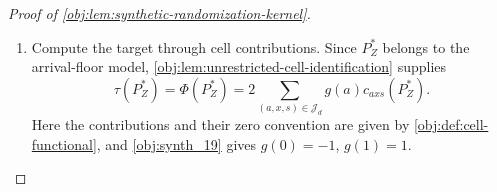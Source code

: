 \begin{proof}[Proof of \cref{obj:lem:synthetic-randomization-kernel}]
\begin{enumerate}
For a deterministic input sample
\[
\mathbf z=((x_i,b_i,y_i))_{i=1}^n
\in\bigl(\{1,\ldots,d\}\times\{0,1\}^2\bigr)^n
\]
and \(\mathbf u=(u_i)_{i=1}^n\in\{0,1\}^n\), define
\[
\mathsf o_n(\mathbf z,\mathbf u)
:=
\bigl(o(x_i,b_i,y_i;u_i)\bigr)_{i=1}^n,
\qquad
\kappa_{\mathrm{syn},n}(\mathbf z,\cdot)
:=
\bigotimes_{i=1}^n
\kappa_{\mathrm{syn}}\bigl((x_i,b_i,y_i),\cdot\bigr).
\]
Independent fair draws give
\[
\kappa_{\mathrm{syn},n}(\mathbf z,\cdot)
=
\bigl(\mathsf o_n(\mathbf z,\cdot)\bigr)_{\#}
\nu_{\mathrm{coin}}^{\otimes n},
\]
where the subscript \(\#\) denotes pushforward. Integrating over the input sample, regrouping the product coordinates into record--coin pairs, and then applying the record map coordinatewise gives
\[
\begin{aligned}
\int\kappa_{\mathrm{syn},n}(\mathbf z,\cdot)\,
P_Z^{\otimes n}(d\mathbf z)
&=
(\mathsf o_n)_{\#}
\bigl(P_Z^{\otimes n}\otimes\nu_{\mathrm{coin}}^{\otimes n}\bigr)\\
&=
\bigotimes_{i=1}^n
\left[
\int\kappa_{\mathrm{syn}}\bigl((x,b,y),\cdot\bigr)\,
P_Z(d(x,b,y))
\right]\\
&=
\nu_{\mathrm{obs}}^{\otimes n}.
\end{aligned}
\]
The regrouping is justified by the product identity
\[
\left(\prod_{i=1}^nP_Z(dz_i)\right)
\left(\prod_{i=1}^n\nu_{\mathrm{coin}}(du_i)\right)
=
\prod_{i=1}^n
\left(P_Z(dz_i)\nu_{\mathrm{coin}}(du_i)\right),
\]
and coordinatewise pushforward preserves this product form. Thus the kernel produces exactly the observed product law identified in the preceding step, and its output satisfies \cref{obj:ass:iid-sampling}.

\item Compute the target through cell contributions. Since \(P_Z^*\) belongs to the arrival-floor model, \cref{obj:lem:unrestricted-cell-identification} supplies
\[
\tau(P_Z^*)=\Phi(P_Z^*)
=
2\sum_{(a,x,s)\in\mathcal J_d}g(a)c_{axs}(P_Z^*).
\]
Here the contributions and their zero convention are given by \cref{obj:def:cell-functional}, and \cref{obj:synth_19} gives \(g(0)=-1\), \(g(1)=1\).


\end{enumerate}
\end{proof}
